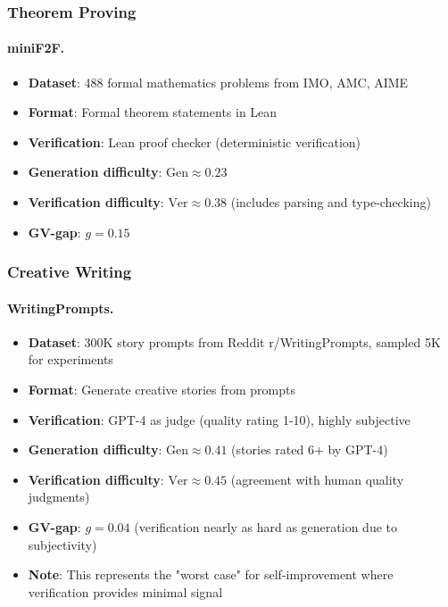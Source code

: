 \documentclass{article}
\theoremstyle{definition}
\theoremstyle{remark}
\newcommand{\Gen}{\text{Gen}}
\newcommand{\Ver}{\text{Ver}}
\begin{document}
\subsubsection{Theorem Proving}

\paragraph{miniF2F.}
\begin{itemize}
\item \textbf{Dataset}: 488 formal mathematics problems from IMO, AMC, AIME
\item \textbf{Format}: Formal theorem statements in Lean
\item \textbf{Verification}: Lean proof checker (deterministic verification)
\item \textbf{Generation difficulty}: \(\Gen \approx 0.23\)
\item \textbf{Verification difficulty}: \(\Ver \approx 0.38\) (includes parsing and type-checking)
\item \textbf{GV-gap}: \(g = 0.15\)
\end{itemize}

\subsubsection{Creative Writing}

\paragraph{WritingPrompts.}
\begin{itemize}
\item \textbf{Dataset}: 300K story prompts from Reddit r/WritingPrompts, sampled 5K for experiments
\item \textbf{Format}: Generate creative stories from prompts
\item \textbf{Verification}: GPT-4 as judge (quality rating 1-10), highly subjective
\item \textbf{Generation difficulty}: \(\Gen \approx 0.41\) (stories rated 6+ by GPT-4)
\item \textbf{Verification difficulty}: \(\Ver \approx 0.45\) (agreement with human quality judgments)
\item \textbf{GV-gap}: \(g = 0.04\) (verification nearly as hard as generation due to subjectivity)
\item \textbf{Note}: This represents the "worst case" for self-improvement where verification provides minimal signal
\end{itemize}
\end{document}
